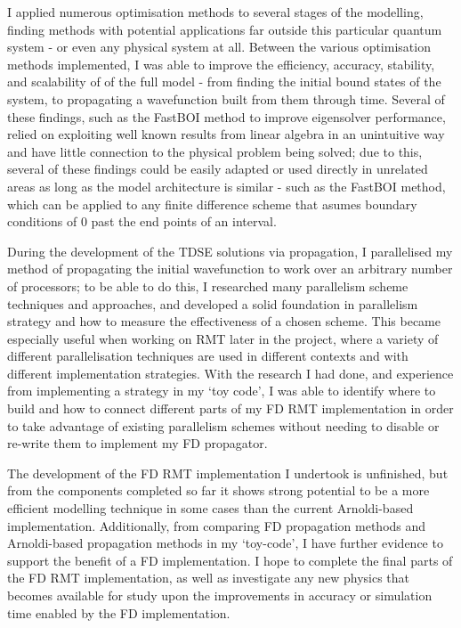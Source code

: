 I applied numerous optimisation methods to several stages of the modelling, finding methods with potential applications far outside this particular quantum system - or even any physical system at all. Between the various optimisation methods implemented, I was able to improve the efficiency, accuracy, stability, and scalability of of the full model - from finding the initial bound states of the system, to propagating a wavefunction built from them through time. Several of these findings, such as the FastBOI method to improve eigensolver performance, relied on exploiting well known results from linear algebra in an unintuitive way and have little connection to the physical problem being solved; due to this, several of these findings could be easily adapted or used directly in unrelated areas as long as the model architecture is similar - such as the FastBOI method, which can be applied to any finite difference scheme that asumes boundary conditions of $0$ past the end points of an interval.

During the development of the TDSE solutions via propagation, I parallelised my method of propagating the initial wavefunction to work over an arbitrary number of processors; to be able to do this, I researched many parallelism scheme techniques and approaches, and developed a solid foundation in parallelism strategy and how to measure the effectiveness of a chosen scheme. This became especially useful when working on RMT later in the project, where a variety of different parallelisation techniques are used in different contexts and with different implementation strategies. With the research I had done, and experience from implementing a strategy in my `toy code', I was able to identify where to build and how to connect different parts of my FD RMT implementation in order to take advantage of existing parallelism schemes without needing to disable or re-write them to implement my FD propagator.

The development of the FD RMT implementation I undertook is unfinished, but from the components completed so far it shows strong potential to be a more efficient modelling technique in some cases than the current Arnoldi-based implementation. Additionally, from comparing FD propagation methods and Arnoldi-based propagation methods in my `toy-code', I have further evidence to support the benefit of a FD implementation. I hope to complete the final parts of the FD RMT implementation, as well as investigate any new physics that becomes available for study upon the improvements in accuracy or simulation time enabled by the FD implementation. 

